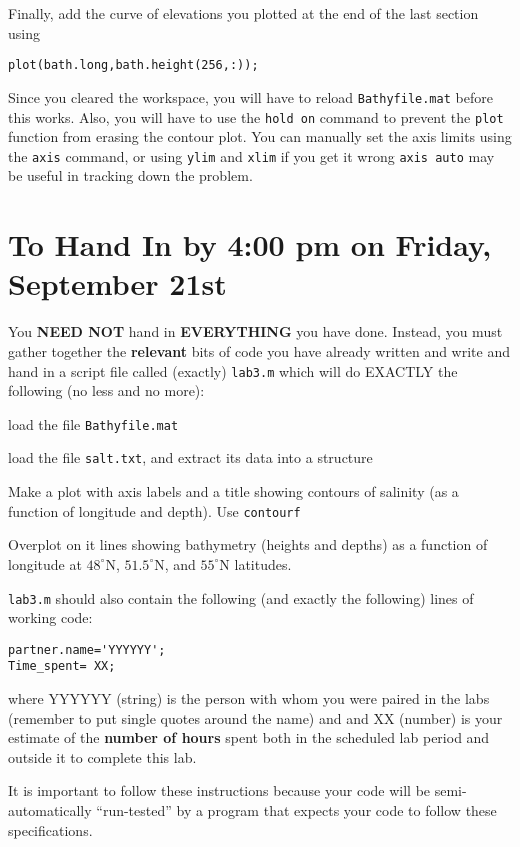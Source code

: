 \documentclass[letterpaper,10pt]{article}
\newcounter{lnum}
\newenvironment{abbrevlist}%
  {\begin{list}{(\arabic{lnum})}{\setlength{\leftmargin}{1em}%
               \setlength{\itemindent}{3em}%
               \setlength{\itemsep}{0pt}%
               \setlength{\parsep}{0pt}%
               \setlength{\topsep}{2pt}%
               \usecounter{lnum} } }{\end{list}}
\begin{document}
Finally, 
add the curve of elevations you plotted at the end of the last section using
\begin{verbatim}
plot(bath.long,bath.height(256,:));
\end{verbatim}
Since you cleared the workspace, you will have to reload \verb+Bathyfile.mat+ before this works.
Also, you will have to use the  \verb+hold on+ command to prevent the \verb+plot+
function from erasing the contour plot. You can manually set the axis limits
using the \verb+axis+ command, or using \verb+ylim+ and \verb+xlim+ if you get it wrong \verb+axis auto+ may be useful in tracking
down the problem.

\section{To Hand In by 4:00 pm on Friday, September 21st}

You {\bf NEED NOT} hand in {\bf EVERYTHING} you have done. Instead, you must gather together the {\bf relevant} bits of code
you have already written and
write and hand in a script file called (exactly) \verb+lab3.m+ which will do EXACTLY the following (no less and no more):
\begin{abbrevlist}
\item load the file \verb+Bathyfile.mat+  
\item load the file \verb+salt.txt+, and extract its data into a structure
\item Make a plot with axis labels and a title showing contours of salinity (as a function of longitude and depth).  Use \verb+contourf+
\item Overplot on it lines showing bathymetry (heights and depths) as a function of longitude at $48^{\circ}$N, $51.5^{\circ}$N,
and $55^{\circ}$N latitudes.
\item \verb+lab3.m+ should also contain the following (and exactly the following)
lines of working code:
\begin{verbatim}
partner.name='YYYYYY';
Time_spent= XX;
\end{verbatim}
where YYYYYY (string) is the person with whom you were paired in the labs (remember to put single
quotes around the name) and 
and XX (number) is your estimate of the {\bf number of hours} spent both in the scheduled lab 
period and outside it to complete this lab.

\end{abbrevlist}
It is important to follow these instructions because your code will be semi-automatically ``run-tested'' by a program that
expects your code to follow these specifications.
\end{document}
